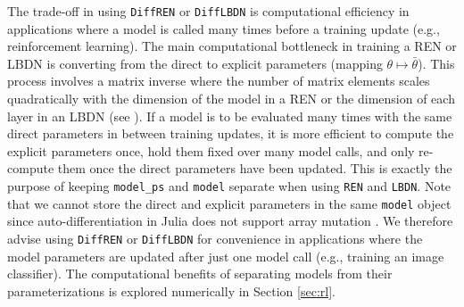 The trade-off in using \verb|DiffREN| or \verb|DiffLBDN| is computational efficiency in applications where a model is called many times before a training update (e.g., reinforcement learning). The main computational bottleneck in training a REN or LBDN is converting from the direct to explicit parameters (mapping $\theta \mapsto \bar{\theta}$). This process involves a matrix inverse where the number of matrix elements scales quadratically with the dimension of the model in a REN or the dimension of each layer in an LBDN (see \cite{Revay++2023,Wang+Manchester2023}). If a model is to be evaluated many times with the same direct parameters in between training updates, it is more efficient to compute the explicit parameters once, hold them fixed over many model calls, and only re-compute them once the direct parameters have been updated. This is exactly the purpose of keeping \verb|model_ps| and \verb|model| separate when using \verb|REN| and \verb|LBDN|. Note that we cannot store the direct and explicit parameters in the same \verb|model| object since auto-differentiation in Julia does not support array mutation \cite{Innes2018b}. We therefore advise using \verb|DiffREN| or \verb|DiffLBDN| for convenience in applications where the model parameters are updated after just one model call (e.g., training an image classifier). The computational benefits of separating models from their parameterizations is explored numerically in Section \ref{sec:rl}.
